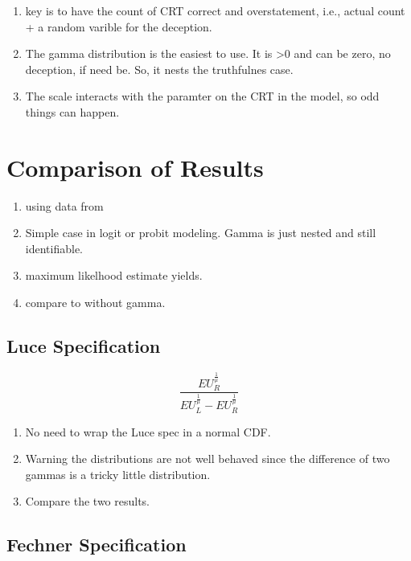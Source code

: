\documentclass{article}
\begin{document}
  \begin{enumerate}
    \item key is to have the count of CRT correct and overstatement, i.e., actual count + a random varible for the deception.
    \item The gamma distribution is the easiest to use.  It is >0 and can be zero, no deception, if need be.  So, it nests the truthfulnes case.
    \item The scale interacts with the paramter on the CRT in the model, so odd things can happen.  
  \end{enumerate}

\section{Comparison of Results}

  \begin{enumerate}
  \item using data from \cite{taylor2013bias}
    \item Simple case in logit or probit modeling.  Gamma is just nested and still identifiable.
    \item maximum likelhood estimate yields.
    \item compare to without gamma.
  \end{enumerate}

  \subsection{Luce Specification}
  
\begin{equation}
\frac{EU_R^{\frac{1}{\mu}}}{EU_L^{\frac{1}{\mu}}-EU_R^{\frac{1}{\mu}}}
\end{equation}
    
    \begin{enumerate}
      \item  No need to wrap the Luce spec in a normal CDF.
      \item Warning the distributions are not well behaved since the difference of two gammas is a tricky little distribution.
      \item Compare the two results.
    \end{enumerate}



  \subsection{Fechner Specification}
\end{document}
